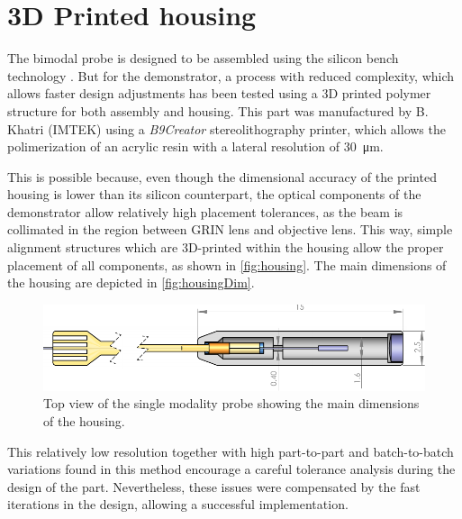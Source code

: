 \documentclass[10pt]{iopart}
\begin{document}
\section{3D Printed housing}

The bimodal probe is designed to be assembled using the silicon bench technology \cite{Kretschmer}. But for the demonstrator, a process with reduced complexity, which allows faster design adjustments has been tested using a 3D printed polymer structure for both assembly and housing. This part was manufactured by B. Khatri (IMTEK) using a \textit{B9Creator} stereolithography printer, which allows the polimerization of an acrylic resin with a lateral resolution of \SI{30}{\micro\meter}.

This is possible because, even though the dimensional accuracy of the printed housing is lower than its silicon counterpart, the optical components of the demonstrator allow relatively high placement tolerances, as the beam is collimated in the region between GRIN lens and objective lens. This way, simple alignment structures which are 3D-printed within the housing allow the proper placement of all components, as shown in \autoref{fig:housing}. The main dimensions of the housing are depicted in \autoref{fig:housingDim}.


\begin{figure}[h!]\centering \includegraphics[width=\columnwidth]{figures/TopDrawing.pdf}
      \caption{Top view of the single modality probe showing the main dimensions of the housing.}
      \label{fig:housingDim}
\end{figure}

This relatively low resolution together with high part-to-part and batch-to-batch variations found in this method encourage a careful tolerance analysis during the design of the part. Nevertheless, these issues were compensated by the fast iterations in the design, allowing a successful implementation.


\end{document}
